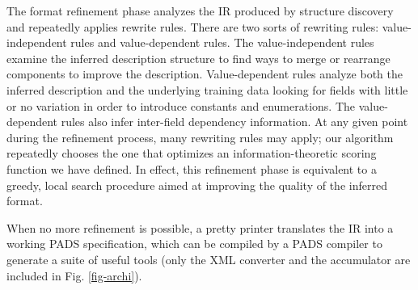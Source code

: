 \documentclass{sig-alternate-sigmod08}
\begin{document}
The format refinement phase analyzes the IR produced by structure discovery
and repeatedly applies 
rewrite rules.  There are two sorts of rewriting rules: 
value-independent rules and value-dependent rules.
The value-independent rules examine the inferred description structure
to find ways to merge or rearrange components to improve the description.
Value-dependent rules analyze both the inferred description and the underlying
training data looking for fields with little or no 
variation in order to introduce constants and enumerations.
The value-dependent rules also infer
inter-field dependency information.
At any given point during the refinement process,
many rewriting rules may apply; our algorithm repeatedly chooses the one 
that optimizes an information-theoretic
scoring function we have defined.
In effect, this refinement phase is equivalent to a greedy, local search
procedure aimed at improving the quality of the inferred format.


%

When no more refinement is possible, a pretty printer 
translates the IR into a working PADS 
specification,  which can be compiled by a PADS compiler to generate
a suite of useful tools (only the XML converter and the accumulator are included
in Fig. \ref{fig-archi}). 

%
\end{document}

